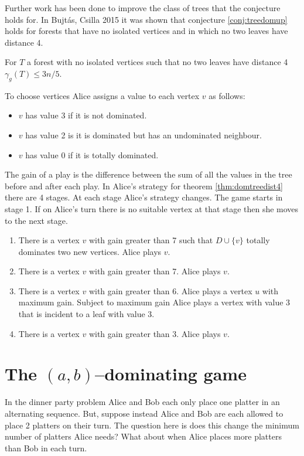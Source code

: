 Further work has been done to improve the class of trees that the conjecture holds for. In Bujt\'{a}s, Csilla 2015 \cite{Bujt2015} it was shown that conjecture \ref{conj:treedomup} holds for forests that have no isolated vertices and in which no two leaves have distance 4.
%
\begin{theorem}\label{thm:domtreedist4}
    For $T$ a forest with no isolated vertices such that no two leaves have distance 4
    $\gamma_g(T)\leq 3n/5$.
\end{theorem}
To choose vertices Alice assigns a value to each vertex $v$ as follows: 
\begin{itemize}
    \item $v$ has value 3 if it is not dominated.
    \item $v$ has value 2 is it is dominated but has an undominated neighbour.
    \item $v$ has value 0 if it is totally dominated.
\end{itemize}
The gain of a play is the difference between the sum of all the values in the tree before and after each play. In Alice's strategy for theorem \ref{thm:domtreedist4} there are 4 stages. At each stage Alice's strategy changes. The game starts in stage 1. If on Alice's turn there is no suitable vertex at that stage then she moves to the next stage. 
\begin{enumerate}[St{a}ge 1:]
    \item There is a vertex $v$ with gain greater than 7 such that $D\cup\{v\}$ totally dominates two new vertices. Alice plays $v$.
    \item There is a vertex $v$ with gain greater than 7. Alice plays $v$.
    \item There is a vertex $v$ with gain greater than 6. Alice plays a vertex $u$ with maximum gain. Subject to maximum gain Alice plays a vertex with value 3 that is incident to a leaf with value 3.
    \item There is a vertex $v$ with gain greater than 3. Alice plays $v$.
\end{enumerate}

\section{The $(a,b)$--dominating game}

In the dinner party problem Alice and Bob each only place one platter in an alternating sequence. But, suppose instead Alice and Bob are each allowed to place 2 platters on their turn. The question here is does this change the minimum number of platters Alice needs? What about when Alice places more platters than Bob in each turn.

